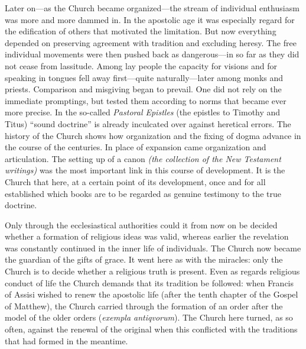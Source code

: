 \documentclass[12pt,a4paper]{book}
\newcommand{\opage}[1]{\marginnote{\footnotesize\textit{[#1]}}}
\begin{document}
Later on---as the Church became organized---the stream of individual enthusiasm was more and more
dammed in.
In the apostolic age it was especially regard for the edification of others that motivated the
limitation. But now everything depended on preserving agreement with tradition and excluding heresy.
The free individual movements were then pushed back as dangerous---in so far as they did not cease
from lassitude. Among lay people the capacity for visions and for speaking in tongues fell away
first---quite naturally---later among monks and priests. Comparison and misgiving began to prevail.
One did not rely on the immediate promptings, but tested them according to norms that became ever
more precise. In the so-called \emph{Pastoral Epistles} (the epistles to Timothy and Titus) ``sound
doctrine'' is already inculcated over against heretical errors. The history of the Church shows how
organization and the fixing of dogma advance in the course of the centuries. In place of expansion
came organization and articulation. The setting up of a canon \emph{(the collection of the New
Testament 
\opage{114}writings)} was the most important link in this course of development. It is the Church
that here, at a certain point of its development, once and for all established which books are to be
regarded as genuine testimony to the true doctrine.

Only through the ecclesiastical authorities could it from now on be decided whether a formation of
religious ideas was valid, whereas earlier the revelation was constantly continued in the inner life
of individuals. The Church now became the guardian of the gifts of grace. It went here as with the
miracles: only the Church is to decide whether a religious truth is present. Even as regards
religious conduct of life the Church demands that its tradition be followed: when Francis of Assisi
wished to renew the apostolic life (after the tenth chapter of the Gospel of Matthew), the Church
carried through the formation of an order after the model of the older orders (\textit{exempla
antiqvorum}). The Church here turned, as so often, against the renewal of the original when this
conflicted with the traditions that had formed in the meantime.
\end{document}
